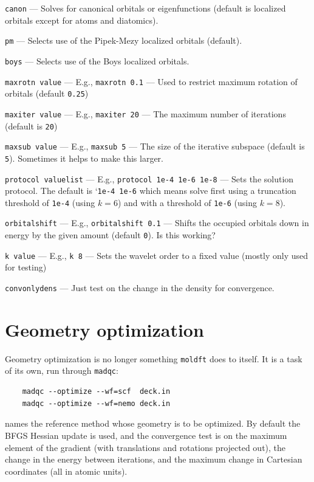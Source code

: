 \documentclass[letterpaper]{book}
\begin{document}
{\tt canon} --- Solves for canonical orbitals or eigenfunctions (default is localized orbitals except for atoms and diatomics).

{\tt pm} --- Selects use of the Pipek-Mezy localized orbitals (default).

{\tt boys} --- Selects use of the Boys localized orbitals.

{\tt maxrotn value} --- E.g., {\tt maxrotn 0.1} --- Used to restrict maximum rotation of orbitals (default {\tt 0.25})

{\tt maxiter value} --- E.g., {\tt maxiter 20} --- The maximum number of iterations (default is {\tt 20})

{\tt maxsub value} --- E.g., {\tt maxsub 5} --- The size of the iterative subspace (default is {\tt 5}).  Sometimes it helps to make this larger.

{\tt protocol valuelist} --- E.g., {\tt protocol 1e-4 1e-6 1e-8} --- Sets the solution protocol.  The default is `{\tt 1e-4 1e-6} which means solve first using a truncation threshold of {\tt 1e-4} (using $k=6$) and with a threshold of {\tt 1e-6} (using $k=8$).

{\tt orbitalshift} --- E.g., {\tt orbitalshift 0.1} --- Shifts the occupied orbitals down in energy by the given amount (default {\tt 0}).  Is this working?

{\tt k value} --- E.g., {\tt k 8} --- Sets the wavelet order to a fixed value (mostly only used for testing)

{\tt convonlydens} --- Just test on the change in the density for convergence.


\section{Geometry optimization}

Geometry optimization is no longer something {\tt moldft} does to itself.  It is a
task of its own, run through {\tt madqc}:

\begin{verbatim}
    madqc --optimize --wf=scf  deck.in
    madqc --optimize --wf=nemo deck.in
\end{verbatim}

 names the reference method whose geometry is to be optimized.
By default the BFGS Hessian update is used, and the convergence test is on the
maximum element of the gradient (with translations and rotations projected out),
the change in the energy between iterations, and the maximum change in Cartesian
coordinates (all in atomic units).
\end{document}
